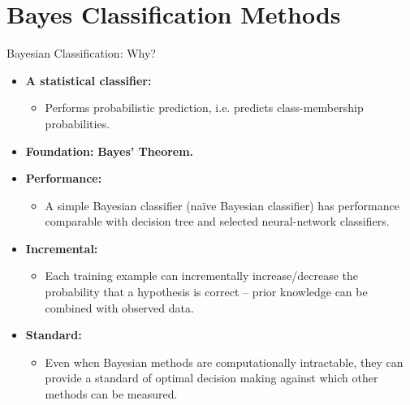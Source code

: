 \section{Bayes Classification Methods}

\begin{frame}{Bayesian Classification: Why?}
  \begin{itemize}
  \item \textbf{A statistical classifier:}
    \begin{itemize}
    \item Performs probabilistic prediction, i.e. predicts class-membership probabilities.
    \end{itemize}
  \item \textbf{Foundation:} \textbf{\color{airforceblue}Bayes' Theorem.}
  \item \textbf{Performance:}
    \begin{itemize}
    \item A simple Bayesian classifier (naïve Bayesian classifier) has performance comparable with decision tree and selected neural-network classifiers.
    \end{itemize}
  \item \textbf{Incremental:}
    \begin{itemize}
    \item Each training example can incrementally increase/decrease the probability that a hypothesis is correct -- prior knowledge can be combined with observed data.
    \end{itemize}
  \item \textbf{Standard:}
    \begin{itemize}
    \item Even when Bayesian methods are computationally intractable, they can provide a standard of optimal decision making against which other methods can be measured.
    \end{itemize}
  \end{itemize}
\end{frame}

